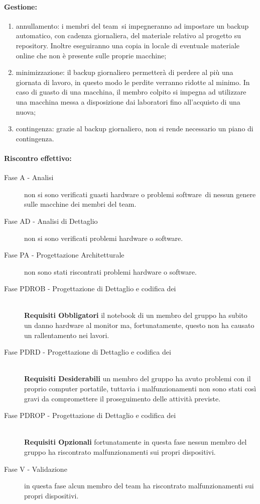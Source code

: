 \documentclass[../PianoProgetto.tex]{subfiles}
\begin{document}
	\paragraph*{Gestione:}
	\begin{enumerate}
		\item annullamento: i membri del team\g\ si impegneranno ad impostare un backup automatico, con cadenza giornaliera, del materiale relativo al progetto su repository\g . Inoltre eseguiranno una copia in locale di eventuale materiale online che non è presente sulle proprie macchine;
		\item minimizzazione: il backup giornaliero permetterà di perdere al più una giornata di lavoro, in questo modo le perdite verranno ridotte al minimo. In caso di guasto di una macchina, il membro colpito si impegna ad utilizzare una macchina messa a disposizione dai laboratori fino all'acquisto di una nuova;
		\item contingenza: grazie al backup giornaliero, non si rende necessario un piano di contingenza.
	\end{enumerate} 	
	
	
	\paragraph*{Riscontro effettivo:}
		\begin{description}
			\item[Fase A - Analisi] non si sono verificati guasti hardware o problemi software\g\ di nessun genere sulle macchine dei membri del team\g .
			\item[Fase AD - Analisi di Dettaglio] non si sono verificati problemi hardware o software\g.
			\item[Fase PA - Progettazione Architetturale] non sono stati riscontrati problemi hardware o software\g.
			\item[Fase PDROB - Progettazione di Dettaglio e codifica dei]  \ \\
					\textbf{Requisiti Obbligatori} il notebook di un membro del gruppo ha subito un danno hardware al monitor ma, fortunatamente, questo non ha causato un rallentamento nei lavori.
			\item[Fase PDRD - Progettazione di Dettaglio e codifica dei] \ \\
					\textbf{Requisiti Desiderabili} un membro del gruppo ha avuto problemi con il proprio computer portatile, tuttavia i malfunzionamenti non sono stati così gravi da compromettere il proseguimento delle attività previste.
			\item[Fase PDROP - Progettazione di Dettaglio e codifica dei]  \ \\
					\textbf{Requisiti Opzionali} fortunatamente in questa fase nessun membro del gruppo ha riscontrato malfunzionamenti sui propri dispositivi.
			\item[Fase V - Validazione] in questa fase alcun membro del team ha riscontrato malfunzionamenti sui propri dispositivi.
		\end{description}
\end{document}
